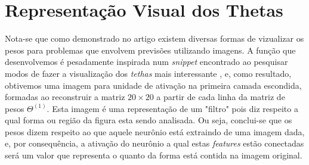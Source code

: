 \section{Representação Visual dos Thetas}
Nota-se que como demonstrado no artigo \cite{voss2021visualizing} existem diversas formas de vizualizar os pesos para problemas que envolvem previsões utilizando imagens. A função que desenvolvemos é pesadamente inspirada num \textit{snippet} encontrado ao pesquisar modos de fazer a visualização dos \textit{tethas} mais interessante \cite{Snaped}, e, como resultado, obtivemos uma imagem para unidade de ativação na primeira camada escondida, formadas ao reconstruir a matriz $20\times20$ a partir de cada linha da matriz de pesos $\Theta^{(1)}$. Esta imagem é uma representação de um "filtro" pois diz respeito a qual forma ou região da figura esta sendo analisada. Ou seja, conclui-se que os pesos dizem respeito ao que aquele neurônio está extraindo de uma imagem dada, e, por consequência, a ativação do neurônio a qual estas \textit{features} estão conectadas será um valor que representa o quanto da forma está contida na imagem original.